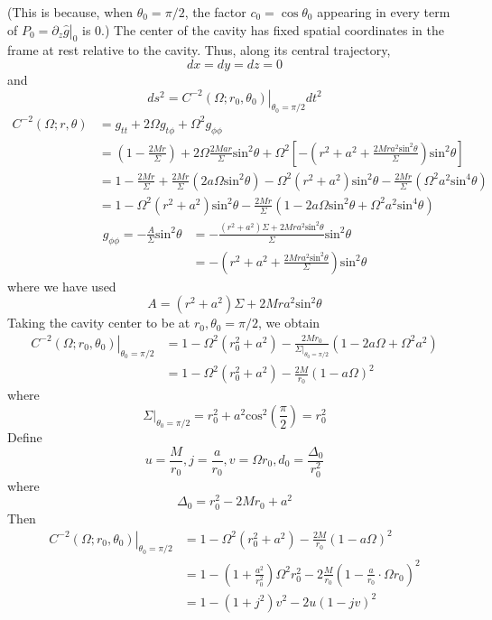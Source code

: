 \documentclass[english]{article}
\begin{document}
(This is because, when $\theta_{0}=\pi/2$, the factor $c_{0}=\cos\theta_{0}$
appearing in every term of $P_{0}=\left.\partial_{z}\hat{g}\right|_{0}$
is $0$.) The center of the cavity has fixed spatial coordinates in
the frame at rest relative to the cavity. Thus, along its central
trajectory, 
\[
dx=dy=dz=0
\]
 and 
\[
ds^{2}=\left.C^{-2}\left(\Omega;r_{0},\theta_{0}\right)\right|_{\theta_{0}=\pi/2}dt^{2}
\]
 {}
\begin{align*}
C^{-2}\left(\Omega;r,\theta\right) & =g_{tt}+2\Omega g_{t\phi}+\Omega^{2}g_{\phi\phi}\\
 & =\left(1-\frac{2Mr}{\Sigma}\right)+2\Omega\frac{2Mar}{\Sigma}\text{sin}^{2}\theta+\Omega^{2}\left[-\left(r^{2}+a^{2}+\frac{2Mra^{2}\text{sin}^{2}\theta}{\Sigma}\right)\text{sin}^{2}\theta\right]\\
 & =1-\frac{2Mr}{\Sigma}+\frac{2Mr}{\Sigma}\left(2a\Omega\text{sin}^{2}\theta\right)-\Omega^{2}\left(r^{2}+a^{2}\right)\text{sin}^{2}\theta-\frac{2Mr}{\Sigma}\left(\Omega^{2}a^{2}\text{sin}^{4}\theta\right)\\
 & =1-\Omega^{2}\left(r^{2}+a^{2}\right)\text{sin}^{2}\theta-\frac{2Mr}{\Sigma}\left(1-2a\Omega\text{sin}^{2}\theta+\Omega^{2}a^{2}\text{sin}^{4}\theta\right)
\end{align*}
 {}
\begin{align*}
g_{\phi\phi}=-\frac{A}{\Sigma}\text{sin}^{2}\theta & =-\frac{\left(r^{2}+a^{2}\right)\Sigma+2Mra^{2}\text{sin}^{2}\theta}{\Sigma}\text{sin}^{2}\theta\\
 & =-\left(r^{2}+a^{2}+\frac{2Mra^{2}\text{sin}^{2}\theta}{\Sigma}\right)\text{sin}^{2}\theta
\end{align*}
 where we have used 
\[
A=\left(r^{2}+a^{2}\right)\Sigma+2Mra^{2}\text{sin}^{2}\theta
\]
 Taking the cavity center to be at $r_{0},\theta_{0}=\pi/2$, we obtain
\begin{align*}
\left.C^{-2}\left(\Omega;r_{0},\theta_{0}\right)\right|_{\theta_{0}=\pi/2} & =1-\Omega^{2}\left(r^{2}_{0}+a^{2}\right)-\frac{2Mr_{0}}{\Sigma|_{\theta_{0}=\pi/2}}\left(1-2a\Omega+\Omega^{2}a^{2}\right)\\
 & =1-\Omega^{2}\left(r^{2}_{0}+a^{2}\right)-\frac{2M}{r_{0}}\left(1-a\Omega\right)^{2}
\end{align*}
 where 
\[
\Sigma|_{\theta_{0}=\pi/2}=r^{2}_{0}+a^{2}\text{cos}^{2}\left(\frac{\pi}{2}\right)=r^{2}_{0}
\]
 Define 
\[
u=\frac{M}{r_{0}},j=\frac{a}{r_{0}},v=\Omega r_{0},d_{0}=\frac{\Delta_{0}}{r^{2}_{0}}
\]
 where 
\[
\Delta_{0}=r^{2}_{0}-2Mr_{0}+a^{2}
\]
 Then 
\begin{align*}
\left.C^{-2}\left(\Omega;r_{0},\theta_{0}\right)\right|_{\theta_{0}=\pi/2} & =1-\Omega^{2}\left(r^{2}_{0}+a^{2}\right)-\frac{2M}{r_{0}}\left(1-a\Omega\right)^{2}\\
 & =1-\left(1+\frac{a^{2}}{r^{2}_{0}}\right)\Omega^{2}r^{2}_{0}-2\frac{M}{r_{0}}\left(1-\frac{a}{r_{0}}\cdot\Omega r_{0}\right)^{2}\\
 & =1-\left(1+j^{2}\right)v^{2}-2u\left(1-jv\right)^{2}
\end{align*}
\end{document}
